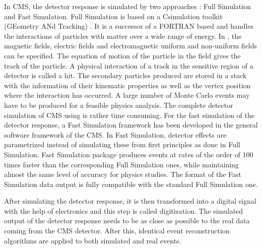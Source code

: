 In CMS, the detector response is simulated by two approaches \cite{Bayatian:2006nff} : Full Simulation and Fast Simulation. Full Simulation is based on a C\plusn\plus simulation toolkit \GEANTfour (GEometry ANd Tracking) \cite{Agostinelli:2002hh}. It is a successor of a FORTRAN based \GEANTthree and handles the interactions of particles with matter over a wide range of energy. In \GEANTfour, the magnetic fields, electric fields and electromagnetic uniform and non-uniform fields can be specified. The equation of motion of the particle in the field gives the track of the particle. A physical interaction of a track in the sensitive region of a detector is called a hit. The secondary particles produced are stored in a stack with the information of their kinematic properties as well as the vertex position where the interaction has occurred. A large number of Monte Carlo events may have to be produced for a feasible physics analysis. The complete detector simulation of CMS using \GEANTfour is rather time consuming. For the fast simulation of the detector response, a Fast Simulation framework \cite{Abdullin:2011zz} has been developed in the general software framework of the CMS. In Fast Simulation, detector effects are parametrized instead of simulating these from first principles as done in Full Simulation. Fast Simulation package produces events at rates of the order of 100 times faster than the corresponding Full Simulation ones, while maintaining almost the same level of accuracy for physics studies. The format of the Fast Simulation data output is fully compatible with the standard Full Simulation one. 

After simulating the detector response, it is then transformed into a digital signal with the help of electronics and this step is called digitization. The simulated output of the detector response needs to be as close as possible to the real data coming from the CMS detector. After this, identical event reconstruction algorithms are applied to both simulated and real events.


